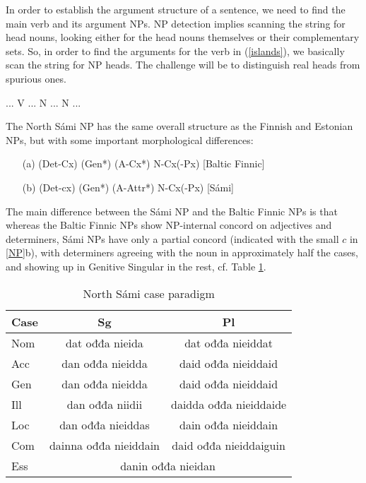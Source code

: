 \documentclass[a4paper,english]{article} %
\begin{document}
In order to establish the argument structure of a sentence, we need to find the main verb and its argument NPs. NP detection implies scanning the string for head nouns, looking either for the head nouns themselves or their complementary sets. So, in order to find the arguments for the verb in (\ref{islands}), we basically scan the string for NP heads. The challenge will be to distinguish real heads from spurious ones.%


\begin{example}\label{islands}
... V ... N ... N ...
\end{example}


The North Sámi NP has the same overall structure as the Finnish and Estonian NPs, but with some important morphological differences:%

\begin{example}\label{NP}
\begin{itemize}
\item[(a)] (Det-Cx) (Gen*) (A-Cx*) N-Cx(-Px) [Baltic Finnic]
\item[(b)] (Det-cx) (Gen*) (A-Attr*) N-Cx(-Px) [Sámi]
\end{itemize}
\end{example}

The main difference between the Sámi NP and the Baltic Finnic NPs is that whereas the Baltic Finnic NPs show NP-internal concord on adjectives and determiners, Sámi NPs have only a partial concord (indicated with the small $c$ in \ref{NP}b), with determiners agreeing with the noun in approximately half the cases, and showing up in Genitive Singular in the rest, cf. Table \ref{smecas}.%

\begin{table}[htdp]
\caption{North Sámi case paradigm}
\begin{center}
\begin{tabular}{|l|c|c|}
\hline
Case  & Sg       & Pl                        \\ \hline
Nom    & dat ođđa nieida      & dat ođđa nieiddat           \\ \hline
Acc    & dan ođđa nieidda    & daid ođđa nieiddaid         \\ \hline
Gen    & dan ođđa nieidda    & daid ođđa nieiddaid         \\ \hline
Ill    & dan ođđa niidii   & daidda ođđa nieiddaide      \\ \hline
Loc    & dan ođđa nieiddas   & dain ođđa nieiddain          \\ \hline
Com    & dainna ođđa nieiddain & daid ođđa  nieiddaiguin     \\ \hline
Ess & \multicolumn{2}{c|}{danin ođđa nieidan}      \\ \hline
\end{tabular}
\end{center}
\label{smecas}
\end{table}%
\end{document}
